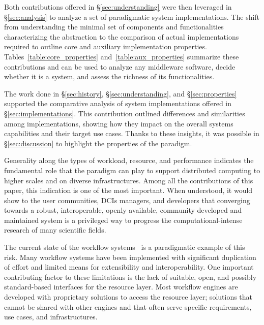 \documentclass{sig-alternate}
\begin{document}
Both contributions offered in \S\ref{sec:understanding} were then leveraged in
\S\ref{sec:analysis} to analyze a set of paradigmatic \pilot system
implementations. The shift from understanding the minimal set of components and
functionalities characterizing the \pilot abstraction to the comparison of
actual \pilot implementations required to outline core and auxiliary
implementation properties. Tables~\ref{table:core_properties}
and~\ref{table:aux_properties} summarize these contributions and can be used to
analyze any middleware software, decide whether it is a \pilot system, and
assess the richness of its functionalities.

The work done in \S\ref{sec:history}, \S\ref{sec:understanding}, and
\S\ref{sec:properties} supported the comparative analysis of \pilot system
implementations offered in \S\ref{sec:implementations}. This contribution
outlined differences and similarities among implementations, showing how they
impact on the overall \pilot systems capabilities and their target use cases.
Thanks to these insights, it was possible in \S\ref{sec:discussion} to highlight
the properties of the \pilot paradigm.

Generality along the types of workload, resource, and performance indicates the
fundamental role that the \pilot paradigm can play to support distributed
computing to higher scales and on diverse infrastructures. Among all the
contributions of this paper, this indication is one of the most important. When
understood, it would show to the user communities, DCIs managers, and developers
that converging towards a robust, interoperable, openly available, community
developed and maintained \pilot system is a privileged way to progress the
computational-intense research of many scientific fields.

The current state of the workflow systems~\cite{taylor2014} is a paradigmatic
example of this risk. Many workflow systems have been implemented with
significant duplication of effort and limited means for extensibility and
interoperability. One important contributing factor to these limitations is the
lack of suitable, open, and possibly standard-based interfaces for the resource
layer. Most workflow engines are developed with proprietary solutions to access
the resource layer; solutions that cannot be shared with other engines and that
often serve specific requirements, use cases, and infrastructures.

\end{document}
